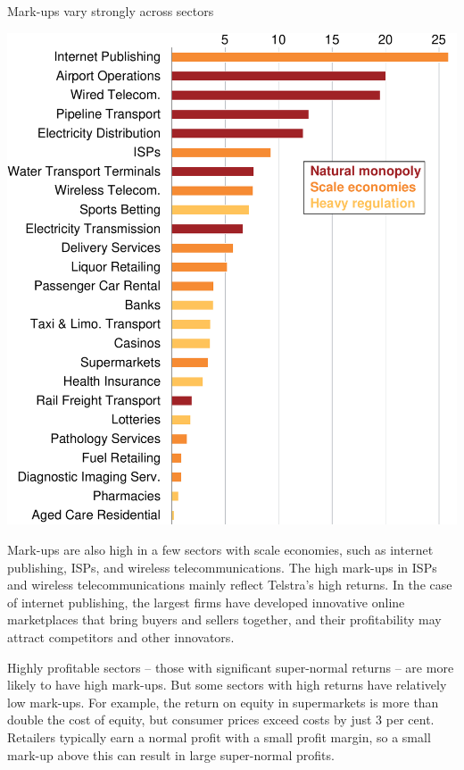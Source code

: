 \begin{figureTop}
  \caption{Mark-ups vary strongly across sectors \label{fig:SNP-pc-of-rev-ind}}
    \includegraphics{atlas/Markups}
\end{figureTop}

Mark-ups are also high in a few sectors with scale economies, such as internet publishing, ISPs, and wireless telecommunications. 
The high mark-ups in ISPs and wireless telecommunications mainly reflect Telstra's high returns. 
In the case of internet publishing, the largest firms have developed innovative online marketplaces that bring buyers and sellers together, and their profitability may attract competitors and other innovators.

Highly profitable sectors -- those with significant super-normal returns -- are more likely to have high mark-ups.
But some sectors with high returns have relatively low mark-ups.
For example, the return on equity in supermarkets is more than double the cost of equity, but consumer prices exceed costs by just 3 per cent.
Retailers typically earn a normal profit with a small profit margin, so a small mark-up above this can result in large super-normal profits.

